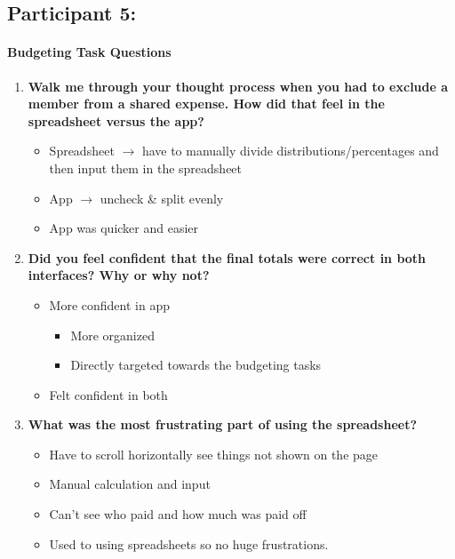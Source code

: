 \documentclass[12pt,a4paper]{article}
\begin{document}
\subsection{Participant 5:}
\paragraph{Budgeting Task Questions}

\begin{enumerate}
    \item \textbf{Walk me through your thought process when you had to exclude a member from a shared expense. How did that feel in the spreadsheet versus the app?}
    
    \begin{itemize}
        \item Spreadsheet $\rightarrow$ have to manually divide distributions/percentages and then input them in the spreadsheet
        \item App $\rightarrow$ uncheck \& split evenly
        \item App was quicker and easier
    \end{itemize}
    
    \item \textbf{Did you feel confident that the final totals were correct in both interfaces? Why or why not?}
    
    \begin{itemize}
        \item More confident in app
        \begin{itemize}
            \item More organized
            \item Directly targeted towards the budgeting tasks
        \end{itemize}
        \item Felt confident in both
    \end{itemize}
    
    \item \textbf{What was the most frustrating part of using the spreadsheet?}
    
    \begin{itemize}
        \item Have to scroll horizontally see things not shown on the page
        \item Manual calculation and input
        \item Can't see who paid and how much was paid off
        \item Used to using spreadsheets so no huge frustrations.
    \end{itemize}
    

\end{enumerate}
\end{document}

